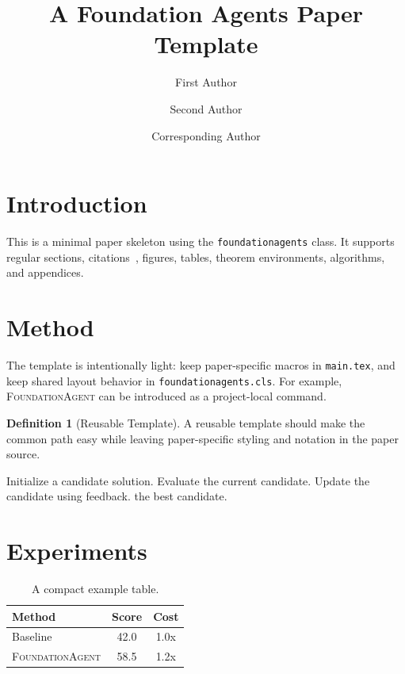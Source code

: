 \documentclass[11pt, a4paper, logo, copyright]{foundationagents}
\title{A Foundation Agents Paper Template}
\author[1,2]{First Author}
\author[2]{Second Author}
\author[1$\dagger$]{Corresponding Author}
\affil[1]{The Hong Kong University of Science and Technology (Guangzhou)}
\affil[2]{Foundation Agents}
\newcommand{\method}{\textsc{FoundationAgent}\xspace}
\theoremstyle{plain}
\theoremstyle{definition}
\newtheorem{definition}[theorem]{Definition}
\begin{document}
\maketitle

\section{Introduction}

This is a minimal paper skeleton using the \texttt{foundationagents} class.
It supports regular sections, citations~\citep{vaswani2017attention}, figures,
tables, theorem environments, algorithms, and appendices.

\section{Method}

The template is intentionally light: keep paper-specific macros in
\texttt{main.tex}, and keep shared layout behavior in \texttt{foundationagents.cls}.
For example, \method can be introduced as a project-local command.

\begin{definition}[Reusable Template]
A reusable template should make the common path easy while leaving paper-specific
styling and notation in the paper source.
\end{definition}

\begin{algorithm}[H]
\caption{Example Procedure}
\label{alg:example}
\begin{algorithmic}[1]
  \State Initialize a candidate solution.
    \State Evaluate the current candidate.
    \State Update the candidate using feedback.
  \EndFor
  \State \Return the best candidate.
\end{algorithmic}
\end{algorithm}

\section{Experiments}

\begin{table}[h]
\caption{A compact example table.}
\label{tab:example}
\centering
\begin{tabular}{lcc}
\toprule
Method & Score & Cost \\
\midrule
Baseline & 42.0 & 1.0x \\
\method & 58.5 & 1.2x \\
\bottomrule
\end{tabular}
\end{table}
\end{document}

